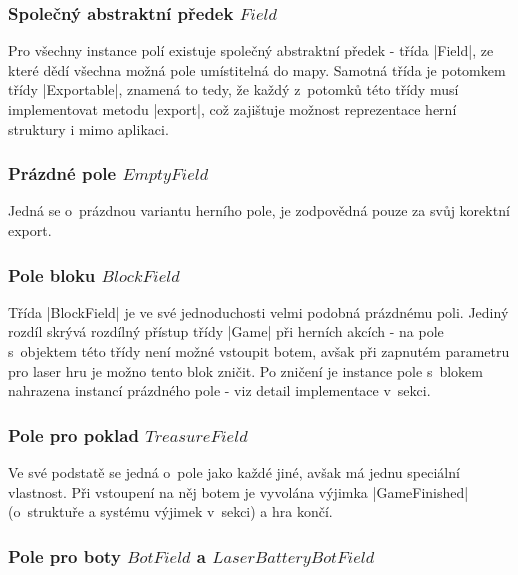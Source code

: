 \subsubsection{Společný abstraktní předek $Field$}

\begin{sloppypar}
	Pro všechny instance polí existuje společný abstraktní předek - třída \ic|Field|, ze které dědí všechna možná pole umístitelná do mapy. Samotná třída je potomkem třídy \ic|Exportable|, znamená to tedy, že každý z~potomků této třídy musí implementovat metodu \ic|export|, což zajištuje možnost reprezentace herní struktury i mimo aplikaci.
\end{sloppypar}

\subsubsection{Prázdné pole $EmptyField$}

Jedná se o~prázdnou variantu herního pole, je zodpovědná pouze za svůj korektní export.

\subsubsection{Pole bloku $BlockField$}

Třída \ic|BlockField| je ve své jednoduchosti velmi podobná prázdnému poli. Jediný rozdíl skrývá rozdílný přístup třídy \ic|Game| při herních akcích - na pole s~objektem této třídy není možné vstoupit botem, avšak při zapnutém parametru pro laser hru je možno tento blok zničit. Po zničení je instance pole s~blokem nahrazena instancí prázdného pole - viz detail implementace v~sekci.

\subsubsection{Pole pro poklad $TreasureField$}

Ve své podstatě se jedná o~pole jako každé jiné, avšak má jednu speciální vlastnost. Při vstoupení na něj botem je vyvolána výjimka \ic|GameFinished| (o~struktuře a systému výjimek v~sekci) a hra končí. 

\subsubsection{Pole pro boty $BotField$ a $LaserBatteryBotField$}

